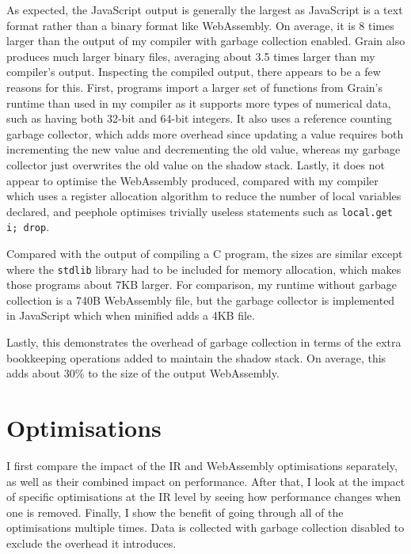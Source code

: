 As expected, the JavaScript output is generally the largest as JavaScript is a text format rather than a binary format like WebAssembly. On average, it is 8 times larger than the output of my compiler with garbage collection enabled. Grain also produces much larger binary files, averaging about 3.5 times larger than my compiler's output. Inspecting the compiled output, there appears to be a few reasons for this. First, programs import a larger set of functions from Grain's runtime than used in my compiler as it supports more types of numerical data, such as having both 32-bit and 64-bit integers. It also uses a reference counting garbage collector, which adds more overhead since updating a value requires both incrementing the new value and decrementing the old value, whereas my garbage collector just overwrites the old value on the shadow stack. Lastly, it does not appear to optimise the WebAssembly produced, compared with my compiler which uses a register allocation algorithm to reduce the number of local variables declared, and peephole optimises trivially useless statements such as \verb|local.get i; drop|.

Compared with the output of compiling a C program, the sizes are similar except where the \verb|stdlib| library had to be included for memory allocation, which makes those programs about 7KB larger. For comparison, my runtime without garbage collection is a 740B WebAssembly file, but the garbage collector is implemented in JavaScript which when minified adds a 4KB file.

Lastly, this demonstrates the overhead of garbage collection in terms of the extra bookkeeping operations added to maintain the shadow stack. On average, this adds about 30\% to the size of the output WebAssembly.

\section{Optimisations}

I first compare the impact of the IR and WebAssembly optimisations separately, as well as their combined impact on performance. After that, I look at the impact of specific optimisations at the IR level by seeing how performance changes when one is removed. Finally, I show the benefit of going through all of the optimisations multiple times. %
Data is collected with garbage collection disabled to exclude the overhead it introduces.

